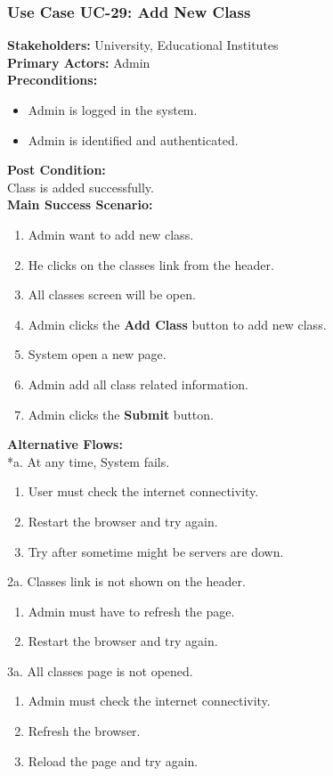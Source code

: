 \documentclass[12pt]{article}
\begin{document}
\subsubsection{Use Case UC-29: Add New Class}
\textbf{Stakeholders: } University, Educational Institutes \\
\textbf{Primary Actors: } Admin \\
\textbf{Preconditions:}
\begin{itemize}
\item Admin is logged in the system.
\item Admin is identified and authenticated.
\end{itemize}
\textbf{Post Condition: }\\
Class is added successfully.\\
\textbf{Main Success Scenario:}
\begin{enumerate}
\item Admin want to add new class.
\item He clicks on the classes link from the header.
\item All classes screen will be open.
\item Admin clicks the \textbf{Add Class} button to add new class.
\item System open a new page.
\item Admin add all class related information.
\item Admin clicks the \textbf{Submit} button. 
\end{enumerate}
\textbf{Alternative Flows:}\\
*a. At any time, System fails.
\begin{enumerate}
\item User must check the internet connectivity.
\item Restart the browser and try again.
\item Try after sometime might be servers are down.
\end{enumerate}
2a. Classes link is not shown on the header.
\begin{enumerate}
\item Admin must have to refresh the page.
\item Restart the browser and try again.
\end{enumerate} 
3a. All classes page is not opened.
\begin{enumerate}
\item Admin must check the internet connectivity.
\item Refresh the browser.
\item Reload the page and try again.
\end{enumerate}
\end{document}
